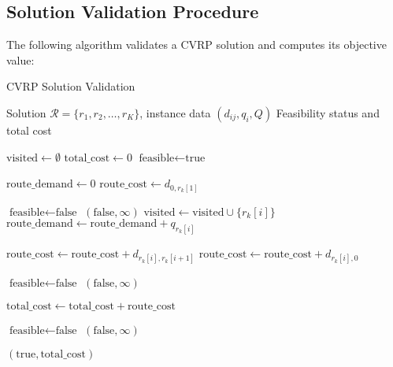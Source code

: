 \documentclass[11pt]{article}
\begin{document}
\subsection{Solution Validation Procedure}

The following algorithm validates a CVRP solution and computes its objective value:

\begin{algorithm}
\caption{CVRP Solution Validation}
\begin{algorithmic}[1]
\REQUIRE Solution $\mathcal{R} = \{r_1, r_2, \ldots, r_K\}$, instance data $(d_{ij}, q_i, Q)$
\ENSURE Feasibility status and total cost

\STATE $\text{visited} \leftarrow \emptyset$ 
\STATE $\text{total\_cost} \leftarrow 0$
\STATE $\text{feasible} \leftarrow \text{true}$

    \STATE $\text{route\_demand} \leftarrow 0$
    \STATE $\text{route\_cost} \leftarrow d_{0, r_k[1]}$ 
    
            \STATE $\text{feasible} \leftarrow \text{false}$ 
            \RETURN $(\text{false}, \infty)$
        \ENDIF
        \STATE $\text{visited} \leftarrow \text{visited} \cup \{r_k[i]\}$
        \STATE $\text{route\_demand} \leftarrow \text{route\_demand} + q_{r_k[i]}$
        
            \STATE $\text{route\_cost} \leftarrow \text{route\_cost} + d_{r_k[i], r_k[i+1]}$
        \ELSE
            \STATE $\text{route\_cost} \leftarrow \text{route\_cost} + d_{r_k[i], 0}$ 
        \ENDIF
    \ENDFOR
    
        \STATE $\text{feasible} \leftarrow \text{false}$ 
        \RETURN $(\text{false}, \infty)$
    \ENDIF
    
    \STATE $\text{total\_cost} \leftarrow \text{total\_cost} + \text{route\_cost}$
\ENDFOR

    \STATE $\text{feasible} \leftarrow \text{false}$ 
    \RETURN $(\text{false}, \infty)$
\ENDIF

\RETURN $(\text{true}, \text{total\_cost})$
\end{algorithmic}
\end{algorithm}
\end{document}
